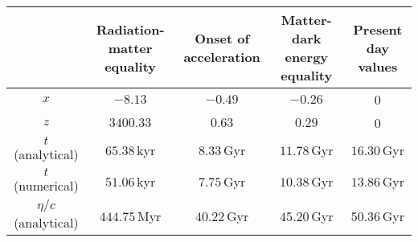 \documentclass{aa}
\numberwithin{equation}{section}
\numberwithin{table}{section}
\numberwithin{figure}{section}
\begin{document}
\begin{table*}
  \caption{Key cosmological timestamps at radiation-matter equality, the onset of acceleration, matter-dark energy equality, and present-day values. The analytical values are obtained using approximations from the theory section, while the numerical values are extracted from splines after solving the full system of equations. Discrepancies between the two highlight the limitations of the analytical approximations, especially during transition epochs.}             %
  \label{table:time stamps}      %
  \centering                          %
  \begin{tabular}{| c || c | c | c | c |}        %
  \hline                %
   & Radiation-matter equality & Onset of acceleration & Matter-dark energy equality & Present day values \\    %
  \hline\hline                        %
  \hspace{6pt}$x$\hspace{53pt} & \hspace{8.5pt}$-8.13$ & $-0.49$ & $-0.26$ & 0 \\      %
  \hline 
  \hspace{6pt}$z$\hspace{53pt} & $3400.33$ & \hspace{6.5pt}$0.63$ & \hspace{7pt}$0.29$  & 0 \\
  \hline 
  \hspace{6pt}$t$ \hspace{5pt}(analytical) & \hspace{25pt}$65.38\,$kyr & \hspace{24.5pt}$8.33\,$Gyr & \hspace{19pt}$11.78\,$Gyr & \hspace{25pt}$16.30\,$Gyr \\
  \hspace{6pt}$t$ \hspace{5pt}(numerical) & \hspace{25pt}$51.06\,$kyr & \hspace{24.5pt}$7.75\,$Gyr & \hspace{19pt}$10.38\,$Gyr & \hspace{25pt}$13.86\,$Gyr \\
  \hline 
     $\eta/c$ (analytical) & \hspace{25pt}$444.75\,$Myr & \hspace{20.5pt}$40.22\,$Gyr & \hspace{19pt}$45.20\,$Gyr & \hspace{25pt}$50.36\,$Gyr \\ 

\end{tabular}
\end{table*}
\end{document}
